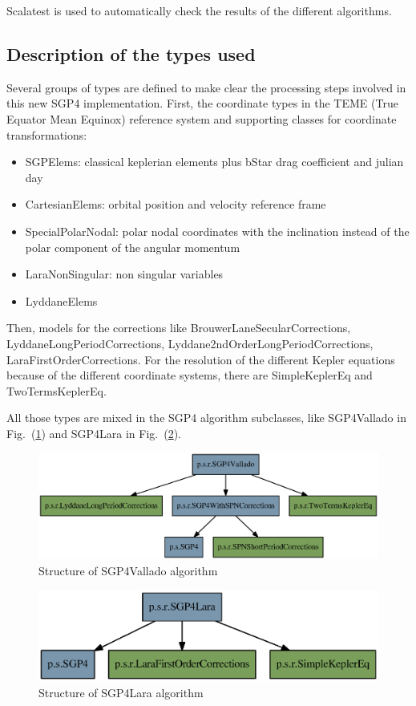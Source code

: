\documentclass{article}
\begin{document}
Scalatest is used to automatically check the results of the different algorithms.

\subsection{Description of the types used}
\label{sec:typesystem}

Several groups of types are defined to make clear the processing steps involved in this new SGP4 implementation.
First, the coordinate types in the TEME (True Equator Mean Equinox) reference system and supporting classes for coordinate transformations:
\begin{itemize}
\item SGPElems: classical keplerian elements plus bStar drag coefficient and julian day
\item CartesianElems: orbital position and velocity reference frame
\item SpecialPolarNodal: polar nodal coordinates with the inclination instead of the polar component of the angular momentum
\item LaraNonSingular: non singular variables
\item LyddaneElems
\end{itemize}
Then, models for the corrections like BrouwerLaneSecularCorrections, LyddaneLongPeriodCorrections, Lyddane2ndOrderLongPeriodCorrections, LaraFirstOrderCorrections. For the resolution of
the different Kepler equations because of the different coordinate systems,
there are SimpleKeplerEq and TwoTermsKeplerEq.

All those types are mixed in the SGP4 algorithm subclasses, like SGP4Vallado in Fig.~(\ref{fig:valladoeps}) and SGP4Lara in Fig.~(\ref{fig:laraeps}).

\begin{figure}[!htbp]
  \centering
	\includegraphics[width=\linewidth]{vallado.eps}
\caption{Structure of SGP4Vallado algorithm}
\label{fig:valladoeps}
\end{figure}

\begin{figure}[!htbp]
  \centering
	\includegraphics[width=\linewidth]{lara.eps}
\caption{Structure of SGP4Lara algorithm}
\label{fig:laraeps}
\end{figure}
\end{document}
